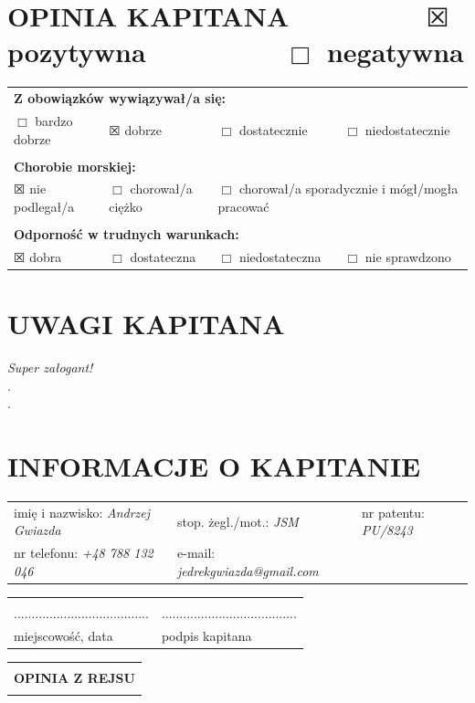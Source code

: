 \documentclass{article}
\begin{document}
\section*{OPINIA KAPITANA ~~~~~~~~ $\XBox$ pozytywna ~~~~~~~~ $\Box$ negatywna}

\begin{tabularx}{\textwidth}{X X X X}
\multicolumn{4}{l}{\textbf{Z obowiązków wywiązywał/a się:}}\\
$\Box$ bardzo dobrze & $\XBox$ dobrze & $\Box$ dostatecznie & $\Box$ niedostatecznie\\
\\
\multicolumn{4}{l}{\textbf{Chorobie morskiej:}}\\
$\XBox$ nie podlegał/a & $\Box$ chorował/a ciężko & \multicolumn{2}{l}{$\Box$ chorował/a sporadycznie i mógł/mogła pracować}\\
\\
\multicolumn{4}{l}{\textbf{Odporność w trudnych warunkach:}}\\
$\XBox$ dobra & $\Box$ dostateczna & $\Box$ niedostateczna & $\Box$ nie sprawdzono\\
\end{tabularx}

\section*{UWAGI KAPITANA}


\textit{Super załogant!}\dotfill \\
.\dotfill \\
.\dotfill \\
\section*{INFORMACJE O KAPITANIE}
\begin{tabularx}{\textwidth}{X X X}
imię i nazwisko: \textit{Andrzej Gwiazda} & stop. żegl./mot.: \textit{JSM} & nr patentu: \textit{PU/8243} \\
nr telefonu: \textit{+48 788 132 046} & e-mail: \textit{jedrekgwiazda@gmail.com} \\
\end{tabularx}

\begin{tabularx}{\textwidth}{X X}
\\\\
...................................... & ......................................\\
miejscowość, data & podpis kapitana\\
\end{tabularx}
\newpage
\begin{tabularx}{\textwidth} { 
  | >{\centering\arraybackslash}X | }
 \hline
 \\
 \textbf{\huge OPINIA Z REJSU} \\
 \\
\hline
\end{tabularx}
\end{document}
